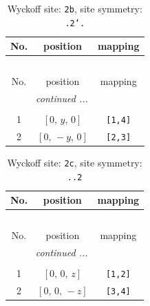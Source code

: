 \documentclass[fleqn,8pt]{jsarticle}
\begin{document}
\begin{longtable}{ccc}
\caption{Wyckoff site: {\tt 2b}, site symmetry: {\tt .2'.}}
 \\
 \hline \hline
No. & position & mapping \\ \hline \endfirsthead

\multicolumn{2}{l}{\tablename\ \thetable{}} \\
 \hline \hline
No. & position & mapping \\ \hline \endhead

 \hline \hline
\multicolumn{2}{r}{\footnotesize\it continued ...} \\ \endfoot

 \hline \hline
\multicolumn{2}{r}{} \\ \endlastfoot

1 & $\left[ 0,\, y,\, 0 \right]$ & {\tt [1,4]} \\ \hline
2 & $\left[ 0,\, - y,\, 0 \right]$ & {\tt [2,3]} \\
\end{longtable}
\renewcommand{\arraystretch}{1.2}
\begin{longtable}{ccc}
\caption{Wyckoff site: {\tt 2c}, site symmetry: {\tt ..2}}
 \\
 \hline \hline
No. & position & mapping \\ \hline \endfirsthead

\multicolumn{2}{l}{\tablename\ \thetable{}} \\
 \hline \hline
No. & position & mapping \\ \hline \endhead

 \hline \hline
\multicolumn{2}{r}{\footnotesize\it continued ...} \\ \endfoot

 \hline \hline
\multicolumn{2}{r}{} \\ \endlastfoot

1 & $\left[ 0,\, 0,\, z \right]$ & {\tt [1,2]} \\ \hline
2 & $\left[ 0,\, 0,\, - z \right]$ & {\tt [3,4]} \\
\end{longtable}
\renewcommand{\arraystretch}{1.2}
\end{document}
